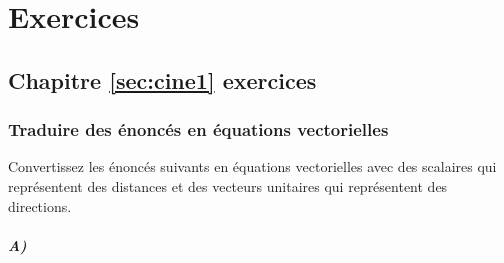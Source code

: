 \chapter{Exercices}
\label{sec:exer}

\section{Chapitre \ref{sec:cine1} exercices}

%
%
%
%
%
%
%
%
%
%



\subsection{Traduire des énoncés en équations vectorielles}
\label{sec:exerposmaison}

Convertissez les énoncés suivants en équations vectorielles avec des scalaires qui représentent des distances et des vecteurs unitaires qui représentent des directions.

\paragraph{A)}

